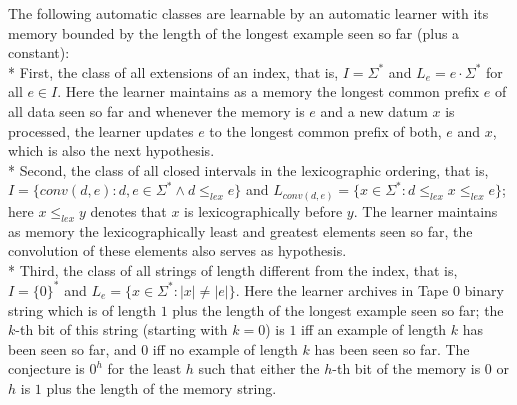 \documentclass{LMCS}
\theoremstyle{plain}\newtheorem{athm}[thm]{Theorem}
\theoremstyle{plain}\newtheorem{aprop}[thm]{Proposition}
\theoremstyle{plain}\newtheorem{aprob}[thm]{Open Problem}
\theoremstyle{plain}\newtheorem{acor}[thm]{Corollary}
\theoremstyle{plain}\newtheorem{alem}[thm]{Lemma}
\theoremstyle{definition}\newtheorem{adefn}[thm]{Definition}
\theoremstyle{definition}\newtheorem{arem}[thm]{Remark}
\theoremstyle{plain}\newtheorem{aexmp}[thm]{Example}
\theoremstyle{plain}\newtheorem{aclm}[thm]{Claim}
\def\sp{\\*\indent}
\begin{document}
\begin{exa} \label{ex:autolearn}
The following automatic classes are learnable by an automatic learner
with its memory bounded by the length of the longest example seen so
far (plus a constant):
\sp
First, the class of all extensions of an index, that is,
$I = \Sigma^*$ and $L_e = e \cdot \Sigma^*$
for all $e \in I$. Here the learner maintains as a memory the longest
common prefix $e$ of all data seen so far and whenever the memory is $e$
and a new datum $x$ is processed, the learner updates $e$ to the longest
common prefix of both, $e$ and $x$, which is also the next hypothesis.
\sp
Second, the class of all closed intervals in the
lexicographic ordering, that is, $I = \{conv(d,e): d,e \in \Sigma^*
\wedge d \leq_{lex} e\}$ and $L_{conv(d,e)} = \{x \in \Sigma^*:
d \leq_{lex} x \leq_{lex} e\}$; here $x \leq_{lex} y$ denotes that
 $x$ is lexicographically before $y$.
The learner maintains as memory
the lexicographically least and greatest elements seen so far, the convolution
of these elements also serves as hypothesis.
\sp
Third, the class of all strings of
length different from the index, that is, $I = \{0\}^*$ and
$L_e = \{x \in \Sigma^*: |x| \neq |e|\}$. Here the learner archives in
Tape $0$ binary string which is of length $1$ plus the length of
the longest example
seen so far; the $k$-th bit of this string (starting with $k=0$)
is $1$ iff an example
of length $k$ has been seen so far, and $0$ iff no example
of length $k$ has been seen so far. The conjecture is $0^h$ for the least
$h$ such that either the $h$-th bit of the memory is $0$ or $h$ is $1$ plus
the length of the memory string.
\end{exa}
\end{document}
